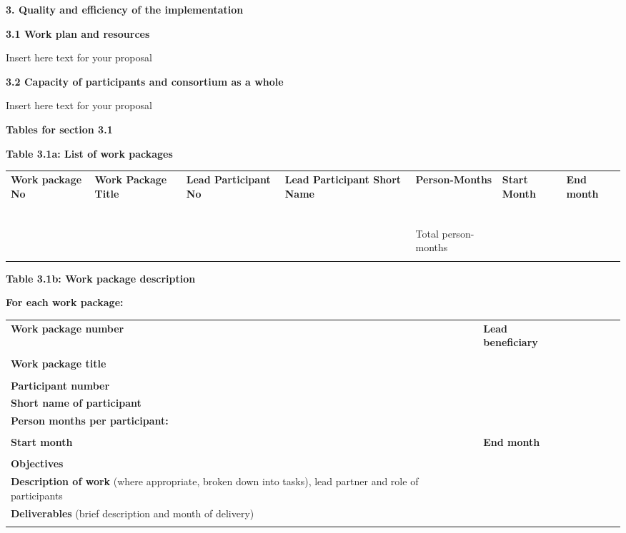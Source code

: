 \textbf{3. Quality and efficiency of the implementation}

\textbf{3.1 Work plan and resources }

Insert here text for your proposal

\textbf{3.2 Capacity of participants and consortium as a whole}

Insert here text for your proposal

\textbf{Tables for section 3.1}

\textbf{Table 3.1a: List of work packages}

\begin{longtable}[]{@{}lllllll@{}}
\toprule
\endhead
\textbf{Work package No} & \textbf{Work Package Title} & \textbf{Lead
Participant No} & \textbf{Lead Participant Short Name} &
\textbf{Person-Months} & \textbf{Start Month} & \textbf{End month} \\
& & & & & & \\
& & & & & & \\
& & & & & & \\
& & & & & & \\
& & & & & & \\
& & & & & & \\
& & & & Total person- months & & \\
& & & & & & \\
\bottomrule
\end{longtable}

\textbf{Table 3.1b: Work package description }

\textbf{For each work package: }

\begin{longtable}[]{@{}llllllll@{}}
\toprule
\endhead
\textbf{Work package number } & & \textbf{Lead beneficiary} & & & & & \\
& & & & & & & \\
\textbf{Work package title} & & & & & & & \\
& & & & & & & \\
\textbf{Participant number} & & & & & & & \\
\textbf{Short name of participant} & & & & & & & \\
\textbf{Person months per participant:} & & & & & & & \\
& & & & & & & \\
\textbf{Start month} & & \textbf{End month} & & & & & \\
& & & & & & & \\
\textbf{Objectives} & & & & & & & \\
\textbf{Description of work} (where appropriate, broken down into
tasks), lead partner and role of participants & & & & & & & \\
\textbf{Deliverables} (brief description and month of delivery) & & & &
& & & \\
& & & & & & & \\
\bottomrule
\end{longtable}

